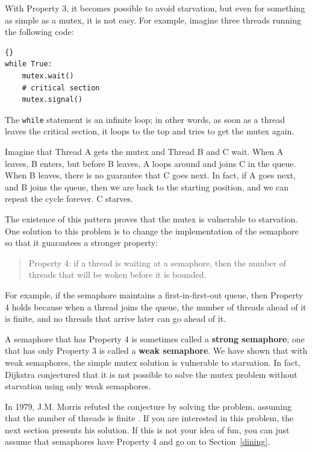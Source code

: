 \documentclass{book}
\begin{document}
With Property 3, it becomes possible to avoid starvation, but
even for something as simple as a mutex, it is not easy.
For example, imagine three threads
running the following code:

\newpage
\begin{lstlisting}[title={Mutex loop}]{}
while True:
    mutex.wait()
    # critical section 
    mutex.signal()
\end{lstlisting}

The {\tt while} statement is an infinite loop; in other words,
as soon as a thread leaves the critical section, it loops to the
top and tries to get the mutex again.

Imagine that Thread A gets the mutex and Thread B and C wait.
When A leaves, B enters, but before B leaves, A loops around
and joins C in the queue.  When B leaves, there is no guarantee
that C goes next.  In fact, if A goes next, and B joins the
queue, then we are back to the starting position, and we can
repeat the cycle forever.  C starves.

The existence of this pattern proves that the mutex is
vulnerable to starvation.  One solution to this problem is
to change the implementation of the semaphore so that it
guarantees a stronger property:

\begin{quote}
    Property 4: if a thread is waiting at a semaphore, then the
    number of threads that will be woken before it is bounded.
\end{quote}

For example, if the semaphore maintains a first-in-first-out
queue, then Property 4 holds because when a thread joins the
queue, the number of threads ahead of it is finite, and
no threads that arrive later can go ahead of it.

A semaphore that has Property 4 is sometimes called a {\bf strong
        semaphore}; one that has only Property 3 is called a {\bf weak
        semaphore}.  We have shown that with weak semaphores, the simple mutex
solution is vulnerable to starvation.  In fact, Dijkstra conjectured
that it is not possible to solve the mutex problem without starvation
using only weak semaphores.

In 1979, J.M. Morris refuted the conjecture by solving the problem,
assuming that the number of threads is finite \cite{morris}.  If you
are interested in this problem, the next section presents his
solution.  If this is not your idea of fun, you can just assume that
semaphores have Property 4 and go on to Section~\ref{dining}.
\end{document}
